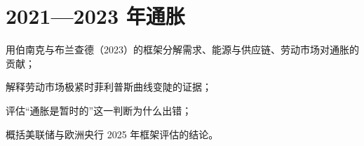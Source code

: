 \chapter{2021—2023 年通胀}\label{ch:inflation21}

\begin{chapterguide}
\begin{guidegoals}
\item 用伯南克与布兰查德（2023）的框架分解需求、能源与供应链、劳动市场对通胀的贡献；
\item 解释劳动市场极紧时菲利普斯曲线变陡的证据；
\item 评估“通胀是暂时的”这一判断为什么出错；
\item 概括美联储与欧洲央行 2025 年框架评估的结论。
\end{guidegoals}
\end{chapterguide}

\chapterstub
